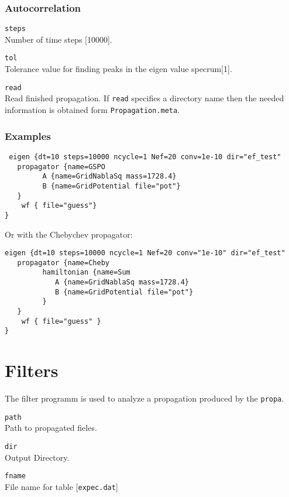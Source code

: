 \documentclass[a4paper,12pt]{scrbook}
\newcommand{\option}[2]{\item \texttt{#1}\\ #2}
\newcommand{\code}[1]{\texttt{#1}}
\begin{document}
\subsubsection*{Autocorrelation}
\begin{options}
\option{steps}{Number of time steps [10000].}
\option{tol}{Tolerance value for finding peaks in the eigen value specrum[1].}
\option{read}{Read finished propagation. If \code{read} specifies a directory name then the needed information is obtained form \code{Propagation.meta}.}
\end{options}


\subsubsection*{Examples}
\begin{verbatim}
 eigen {dt=10 steps=10000 ncycle=1 Nef=20 conv=1e-10 dir="ef_test"
   propagator {name=GSPO
         A {name=GridNablaSq mass=1728.4}
         B {name=GridPotential file="pot"}
   }
    wf { file="guess"}
}
\end{verbatim}
Or with the Chebychev propagator:
\begin{verbatim}
eigen {dt=10 steps=10000 ncycle=1 Nef=20 conv="1e-10" dir="ef_test"
   propagator {name=Cheby
         hamiltonian {name=Sum
            A {name=GridNablaSq mass=1728.4}
            B {name=GridPotential file="pot"}
         }
   }
    wf { file="guess" }
}
\end{verbatim}


\section{Filters}
The filter programm is used to analyze a propagation produced by the \verb|propa|.
\begin{options}
\option{path}{Path to propagated fieles.}
\option{dir}{Output Directory.}
\option{fname}{File name for table [\code{expec.dat}]}
\end{options}
\end{document}
